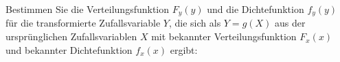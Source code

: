 \documentclass{abgabe}
\begin{document}
\begin{questions}
    \question
    Bestimmen Sie die Verteilungsfunktion $F_y(y)$ und die Dichtefunktion $f_y(y)$ für die transformierte Zufallsvariable $Y$, die sich als $Y = g(X)$ aus der ursprünglichen Zufallsvariablen $X$ mit bekannter Verteilungsfunktion $F_x(x)$ und bekannter Dichtefunktion $f_x(x)$ ergibt: 
\end{questions}
\end{document}
